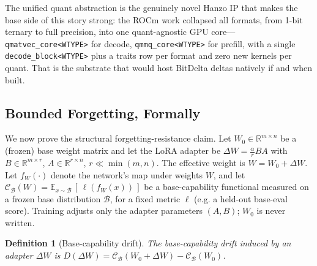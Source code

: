 \documentclass[11pt]{article}
\newtheorem{definition}{Definition}
\begin{document}
The unified quant abstraction is the genuinely novel Hanzo IP that makes the base side of this story strong: the ROCm work collapsed all formats, from 1-bit ternary to full precision, into one quant-agnostic GPU core---\texttt{qmatvec\_core<WTYPE>} for decode, \texttt{qmmq\_core<WTYPE>} for prefill, with a single \texttt{decode\_block<WTYPE>} plus a traits row per format and zero new kernels per quant. That is the substrate that would host BitDelta deltas natively if and when built.

\subsection{Bounded Forgetting, Formally}
\label{sec:forget-formal}

We now prove the structural forgetting-resistance claim. Let $W_0 \in \mathbb{R}^{m\times n}$ be a (frozen) base weight matrix and let the LoRA adapter be $\Delta W = \tfrac{\alpha}{r} BA$ with $B \in \mathbb{R}^{m\times r}$, $A \in \mathbb{R}^{r\times n}$, $r \ll \min(m,n)$. The effective weight is $W = W_0 + \Delta W$. Let $f_W(\cdot)$ denote the network's map under weights $W$, and let $\mathcal{C}_{\mathcal{B}}(W) = \mathbb{E}_{x\sim\mathcal{B}}\,[\,\ell(f_W(x))\,]$ be a base-capability functional measured on a frozen base distribution $\mathcal{B}$, for a fixed metric $\ell$ (e.g. a held-out base-eval score). Training adjusts only the adapter parameters $(A,B)$; $W_0$ is never written.

\begin{definition}[Base-capability drift]
\label{def:drift}
The \emph{base-capability drift} induced by an adapter $\Delta W$ is $D(\Delta W) = \mathcal{C}_{\mathcal{B}}(W_0+\Delta W) - \mathcal{C}_{\mathcal{B}}(W_0)$.
\end{definition}
\end{document}
